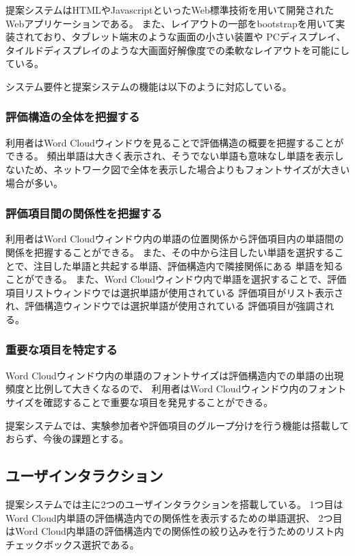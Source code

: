 \documentclass[syuuron]{kuee}
\begin{document}
			提案システムはHTMLやJavascriptといったWeb標準技術を用いて開発されたWebアプリケーションである。
			また、レイアウトの一部をbootstrapを用いて実装されており、タブレット端末のような画面の小さい装置や
			PCディスプレイ、タイルドディスプレイのような大画面好解像度での柔軟なレイアウトを可能にしている。
			
			システム要件と提案システムの機能は以下のように対応している。
			\subsubsection{評価構造の全体を把握する}
				利用者はWord Cloudウィンドウを見ることで評価構造の概要を把握することができる。
				頻出単語は大きく表示され、そうでない単語も意味なし単語を表示しないため、ネットワーク図で全体を表示した場合よりもフォントサイズが大きい場合が多い。				
			\subsubsection{評価項目間の関係性を把握する}
				利用者はWord Cloudウィンドウ内の単語の位置関係から評価項目内の単語間の関係を把握することができる。
				また、その中から注目したい単語を選択することで、注目した単語と共起する単語、評価構造内で隣接関係にある
				単語を知ることができる。
				また、Word Cloudウィンドウ内で単語を選択することで、評価項目リストウィンドウでは選択単語が使用されている
				評価項目がリスト表示され、評価構造ウィンドウでは選択単語が使用されている
				評価項目が強調される。
			\subsubsection{重要な項目を特定する}
				Word Cloudウィンドウ内の単語のフォントサイズは評価構造内での単語の出現頻度と比例して大きくなるので、
				利用者はWord Cloudウィンドウ内のフォントサイズを確認することで重要な項目を発見することができる。
			
			提案システムでは、実験参加者や評価項目のグループ分けを行う機能は搭載しておらず、今後の課題とする。			
			
		\subsection{ユーザインタラクション}
			提案システムでは主に2つのユーザインタラクションを搭載している。
			1つ目はWord Cloud内単語の評価構造内での関係性を表示するための単語選択、
			2つ目はWord Cloud内単語の評価構造内での関係性の絞り込みを行うためのリスト内チェックボックス選択である。
			
\end{document}
